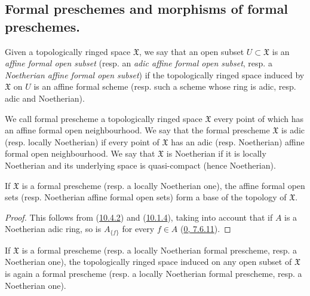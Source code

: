\subsection{Formal preschemes and morphisms of formal preschemes.}
\label{subsection:I.10.4}

\begin{env}[10.4.1]
\label{I.10.4.1}
Given a topologically ringed space $\mathfrak{X}$, we say that an
open subset $U\subset\mathfrak{X}$ is an \emph{affine formal open subset}
(resp. an \emph{adic affine formal open subset}, resp. a \emph{Noetherian
affine formal open subset}) if the topologically ringed space induced by
$\mathfrak{X}$ on $U$ is an affine formal scheme (resp. such a scheme whose
ring is adic, resp. adic and Noetherian).
\end{env}

\begin{definition}[10.4.2]
\label{I.10.4.2}
We call formal prescheme a topologically ringed space $\mathfrak{X}$
every point of which has an affine formal open neighbourhood. We say that
the formal prescheme $\mathfrak{X}$ is adic (resp. locally Noetherian) if
every point of $\mathfrak{X}$ has an adic (resp. Noetherian) affine formal
open neighbourhood. We say that $\mathfrak{X}$ is Noetherian if it is
locally Noetherian and its underlying space is quasi-compact (hence
Noetherian).
\end{definition}

\begin{proposition}[10.4.3]
\label{I.10.4.3}
If $\mathfrak{X}$ is a formal prescheme (resp. a locally Noetherian one),
the affine formal open sets (resp. Noetherian affine formal open sets) form
a base of the topology of $\mathfrak{X}$.
\end{proposition}

\begin{proof}
This follows from (\hyperref[I.10.4.2]{10.4.2}) and
(\hyperref[I.10.1.4]{10.1.4}), taking into account that if $A$ is a
Noetherian adic ring, so is $A_{\{f\}}$ for every
$f\in A$ (\hyperref[0.7.6.11]{0, 7.6.11}).
\end{proof}

\begin{corollary}[10.4.4]
\label{I.10.4.4}
If $\mathfrak{X}$ is a formal prescheme (resp. a locally Noetherian formal
prescheme, resp. a Noetherian one), the topologically ringed space
induced on any open subset of $\mathfrak{X}$ is again a formal prescheme
(resp. a locally Noetherian formal prescheme, resp. a Noetherian one).
\end{corollary}

